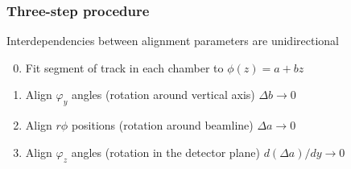 \documentclass[compress]{beamer}
\begin{document}
\begin{frame}
\frametitle{Three-step procedure}

Interdependencies between alignment parameters are unidirectional

\begin{enumerate}\setcounter{enumi}{-1}
\item Fit segment of track in each chamber to $\phi(z) = a + bz$
\item Align $\varphi_y$ angles (rotation around vertical axis) \hfill $\Delta b \to 0$
\item Align $r\phi$ positions (rotation around beamline) \hfill $\Delta a \to 0$
\item Align $\varphi_z$ angles (rotation in the detector plane) \hfill $d(\Delta a)/dy \to 0$
\end{enumerate}


\end{frame}
\end{document}

